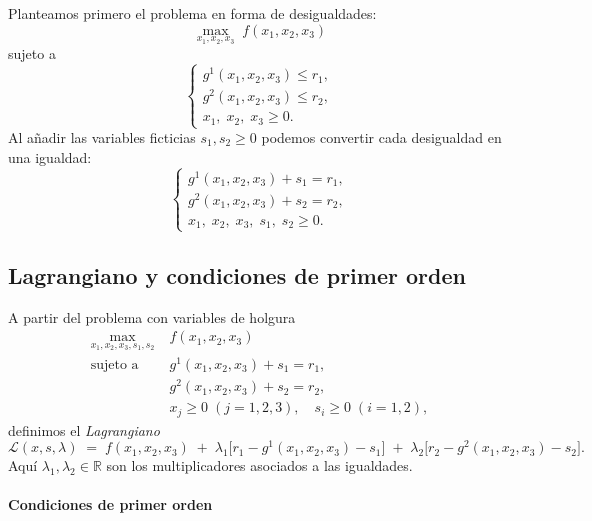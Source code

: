 \documentclass{article}
\begin{document}
Planteamos primero el problema en forma de desigualdades:
\[
\max_{x_1,x_2,x_3}\;f(x_1,x_2,x_3)
\]
sujeto a
\[
\begin{cases}
g^1(x_1,x_2,x_3)\le r_1,\\
g^2(x_1,x_2,x_3)\le r_2,\\
x_1,\;x_2,\;x_3\ge0.
\end{cases}
\]
Al añadir las variables ficticias \(s_1,s_2\ge0\) podemos convertir cada desigualdad en una igualdad:
\[
\begin{cases}
g^1(x_1,x_2,x_3) + s_1 = r_1,\\
g^2(x_1,x_2,x_3) + s_2 = r_2,\\
x_1,\;x_2,\;x_3,\;s_1,\;s_2\ge0.
\end{cases}
\]


\subsection*{Lagrangiano y condiciones de primer orden}

A partir del problema con variables de holgura  
\[
\begin{aligned}
\max_{x_1,x_2,x_3,s_1,s_2}\;&f(x_1,x_2,x_3)\\
\text{sujeto a}\quad 
&g^1(x_1,x_2,x_3)+s_1 = r_1,\\
&g^2(x_1,x_2,x_3)+s_2 = r_2,\\
&x_j\ge0\;(j=1,2,3),\quad s_i\ge0\;(i=1,2),
\end{aligned}
\]
definimos el \emph{Lagrangiano}
\[
\mathcal{L}(x,s,\lambda)
\;=\;
f(x_1,x_2,x_3)
\;+\;\lambda_1\bigl[r_1 - g^1(x_1,x_2,x_3) - s_1\bigr]
\;+\;\lambda_2\bigl[r_2 - g^2(x_1,x_2,x_3) - s_2\bigr].
\]
Aquí \(\lambda_1,\lambda_2\in\mathbb R\) son los multiplicadores asociados a las igualdades.

\bigskip
\paragraph{Condiciones de primer orden}
\end{document}
